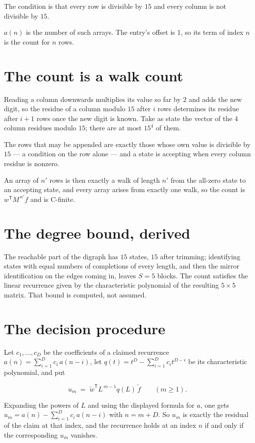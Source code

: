 \documentclass[11pt]{article}
\theoremstyle{definition}
\begin{document}
The condition is that every row is divisible by $15$ and every column is not divisible by $15$.

$a(n)$ is the number of such arrays. The entry's offset is 1, so its term of index $n$ is the count for $n$ rows.

\section{The count is a walk count}

Reading a column downwards multiplies its value so far by $2$ and adds the new digit, so the residue of a column modulo $15$ after $i$ rows determines its residue after $i+1$ rows once the new digit is known. Take as state the vector of the $4$ column residues modulo $15$; there are at most $15^{4}$ of them.

The rows that may be appended are exactly those whose own value is divisible by $15$ --- a condition on the row alone --- and a state is accepting when every column residue is nonzero.

An array of $n'$ rows is then exactly a walk of length $n'$ from the all-zero state to an accepting state, and every array arises from exactly one walk, so the count is $w^{\mathsf T}M^{\,n'}f$ and is C-finite.

\section{The degree bound, derived}

The reachable part of the digraph has $15$ states, $15$ after trimming; identifying states with equal numbers of completions of every length, and then the mirror identification on the edges coming in, leaves $S = 5$ blocks. The count satisfies the linear recurrence given by the characteristic polynomial of the resulting $5\times5$ matrix. That bound is computed, not assumed.

\section{The decision procedure}

Let $c_1,\dots,c_D$ be the coefficients of a claimed recurrence $a(n) = \sum_{i=1}^{D} c_i\,a(n-i)$, let $q(t) = t^{D} - \sum_{i=1}^{D} c_i t^{D-i}$ be its characteristic polynomial, and put

\[u_m \;=\; \tilde w^{\mathsf T} L^{\,m-1} q(L)\,\tilde f \qquad (m \ge 1).\]

Expanding the powers of $L$ and using the displayed formula for $a$, one gets $u_m = a(n) - \sum_{i=1}^{D} c_i\,a(n-i)$ with $n = m + D$. So $u_m$ is exactly the residual of the claim at that index, and the recurrence holds at an index $n$ if and only if the corresponding $u_m$ vanishes.
\end{document}
